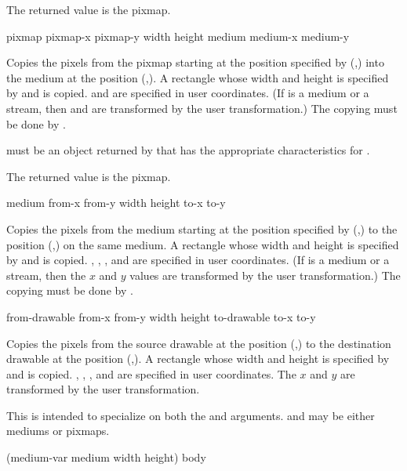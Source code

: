 The returned value is the pixmap.

 {pixmap pixmap-x pixmap-y width height
                           medium medium-x medium-y}

Copies the pixels from the pixmap  starting at the position
specified by (,) into the medium  at the
position (,).  A rectangle whose width and height is
specified by  and  is copied.   and
 are specified in user coordinates.  (If  is a medium or
a stream, then  and  are transformed by the user
transformation.)  The copying must be done by .

 must be an object returned by  that has the
appropriate characteristics for .

The returned value is the pixmap.

 {medium from-x from-y width height to-x to-y}

Copies the pixels from the medium  starting at the position
specified by (,) to the position (,)
on the same medium.  A rectangle whose width and height is specified by
 and  is copied.  , , ,
and  are specified in user coordinates.  (If  is a medium
or a stream, then the $x$ and $y$ values are transformed by the user
transformation.)  The copying must be done by .


 {from-drawable from-x from-y width height
                                to-drawable to-x to-y}

Copies the pixels from the source drawable  at the position
(,) to the destination drawable  at the
position (,).  A rectangle whose width and height is
specified by  and  is copied.  ,
, , and  are specified in user coordinates.
The $x$ and $y$ are transformed by the user transformation.

This is intended to specialize on both the  and
 arguments.   and  may be
either mediums or pixmaps.


 {(medium-var medium \key width height) \body body}

